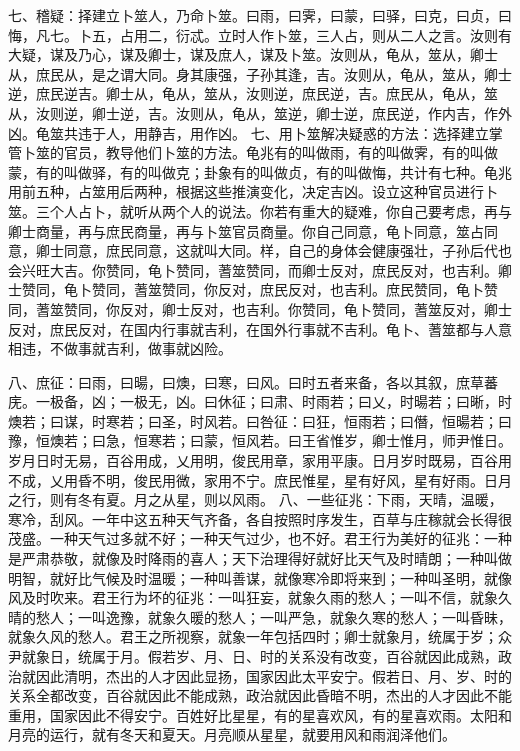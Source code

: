 \documentclass[12pt,UTF8]{ctexbook}
\begin{document}
七、稽疑：择建立卜筮人，乃命卜筮。曰雨，曰霁，曰蒙，曰驿，曰克，曰贞，曰悔，凡七。卜五，占用二，衍忒。立时人作卜筮，三人占，则从二人之言。汝则有大疑，谋及乃心，谋及卿士，谋及庶人，谋及卜筮。汝则从，龟从，筮从，卿士从，庶民从，是之谓大同。身其康强，子孙其逢，吉。汝则从，龟从，筮从，卿士逆，庶民逆吉。卿士从，龟从，筮从，汝则逆，庶民逆，吉。庶民从，龟从，筮从，汝则逆，卿士逆，吉。汝则从，龟从，筮逆，卿士逆，庶民逆，作内吉，作外凶。龟筮共违于人，用静吉，用作凶。
七、用卜筮解决疑惑的方法：选择建立掌管卜筮的官员，教导他们卜筮的方法。龟兆有的叫做雨，有的叫做霁，有的叫做蒙，有的叫做驿，有的叫做克；卦象有的叫做贞，有的叫做悔，共计有七种。龟兆用前五种，占筮用后两种，根据这些推演变化，决定吉凶。设立这种官员进行卜筮。三个人占卜，就听从两个人的说法。你若有重大的疑难，你自己要考虑，再与卿士商量，再与庶民商量，再与卜筮官员商量。你自己同意，龟卜同意，筮占同意，卿士同意，庶民同意，这就叫大同。样，自己的身体会健康强壮，子孙后代也会兴旺大吉。你赞同，龟卜赞同，蓍筮赞同，而卿士反对，庶民反对，也吉利。卿士赞同，龟卜赞同，蓍筮赞同，你反对，庶民反对，也吉利。庶民赞同，龟卜赞同，蓍筮赞同，你反对，卿士反对，也吉利。你赞同，龟卜赞同，蓍筮反对，卿士反对，庶民反对，在国内行事就吉利，在国外行事就不吉利。龟卜、蓍筮都与人意相违，不做事就吉利，做事就凶险。

八、庶征：曰雨，曰暘，曰燠，曰寒，曰风。曰时五者来备，各以其叙，庶草蕃庑。一极备，凶；一极无，凶。曰休征；曰肃、时雨若；曰乂，时暘若；曰晰，时燠若；曰谋，时寒若；曰圣，时风若。曰咎征：曰狂，恒雨若；曰僭，恒暘若；曰豫，恒燠若；曰急，恒寒若；曰蒙，恒风若。曰王省惟岁，卿士惟月，师尹惟日。岁月日时无易，百谷用成，乂用明，俊民用章，家用平康。日月岁时既易，百谷用不成，乂用昏不明，俊民用微，家用不宁。庶民惟星，星有好风，星有好雨。日月之行，则有冬有夏。月之从星，则以风雨。
八、一些征兆：下雨，天晴，温暖，寒冷，刮风。一年中这五种天气齐备，各自按照时序发生，百草与庄稼就会长得很茂盛。一种天气过多就不好；一种天气过少，也不好。君王行为美好的征兆：一种是严肃恭敬，就像及时降雨的喜人；天下治理得好就好比天气及时晴朗；一种叫做明智，就好比气候及时温暖；一种叫善谋，就像寒冷即将来到；一种叫圣明，就像风及时吹来。君王行为坏的征兆：一叫狂妄，就象久雨的愁人；一叫不信，就象久晴的愁人；一叫逸豫，就象久暖的愁人；一叫严急，就象久寒的愁人；一叫昏昧，就象久风的愁人。君王之所视察，就象一年包括四时；卿士就象月，统属于岁；众尹就象日，统属于月。假若岁、月、日、时的关系没有改变，百谷就因此成熟，政治就因此清明，杰出的人才因此显扬，国家因此太平安宁。假若日、月、岁、时的关系全都改变，百谷就因此不能成熟，政治就因此昏暗不明，杰出的人才因此不能重用，国家因此不得安宁。百姓好比星星，有的星喜欢风，有的星喜欢雨。太阳和月亮的运行，就有冬天和夏天。月亮顺从星星，就要用风和雨润泽他们。
\end{document}
